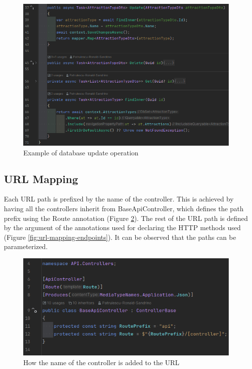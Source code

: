 \begin{figure}[!ht]
    \centering
    \includegraphics[width=1\linewidth]{4.3.3_database-write-update.png}
    \caption{Example of database update operation}
    \label{fig:database-write-update}
\end{figure}

\subsection{URL Mapping}

\par Each URL path is prefixed by the name of the controller. This is achieved by having all the controllers inherit from BaseApiController, which defines the path prefix using the Route annotation (Figure \ref{fig:url-mapping-baseapicontroller}). The rest of the URL path is defined by the argument of the annotations used for declaring the HTTP methods used (Figure \ref{fig:url-mapping-endpoints}). It can be observed that the paths can be parameterized.

\begin{figure}[!ht]
    \centering
    \includegraphics[width=1\linewidth]{4.3.4_url-mapping-baseapicontroller.png}
    \caption{How the name of the controller is added to the URL}
    \label{fig:url-mapping-baseapicontroller}
\end{figure}

